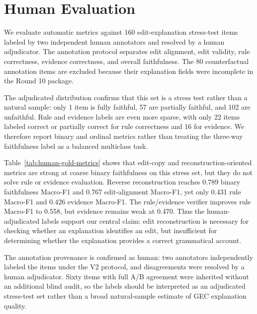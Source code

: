 \section{Human Evaluation}

We evaluate automatic metrics against 160 edit-explanation stress-test items labeled by two independent human annotators and resolved by a human adjudicator. The annotation protocol separates edit alignment, edit validity, rule correctness, evidence correctness, and overall faithfulness. The 80 counterfactual annotation items are excluded because their explanation fields were incomplete in the Round 10 package.

The adjudicated distribution confirms that this set is a stress test rather than a natural sample: only 1 item is fully faithful, 57 are partially faithful, and 102 are unfaithful. Rule and evidence labels are even more sparse, with only 22 items labeled correct or partially correct for rule correctness and 16 for evidence. We therefore report binary and ordinal metrics rather than treating the three-way faithfulness label as a balanced multiclass task.



Table~\ref{tab:human-gold-metrics} shows that edit-copy and reconstruction-oriented metrics are strong at coarse binary faithfulness on this stress set, but they do not solve rule or evidence evaluation. Reverse reconstruction reaches 0.789 binary faithfulness Macro-F1 and 0.767 edit-alignment Macro-F1, yet only 0.431 rule Macro-F1 and 0.426 evidence Macro-F1. The rule/evidence verifier improves rule Macro-F1 to 0.558, but evidence remains weak at 0.470. Thus the human-adjudicated labels support our central claim: edit reconstruction is necessary for checking whether an explanation identifies an edit, but insufficient for determining whether the explanation provides a correct grammatical account.



The annotation provenance is confirmed as human: two annotators independently labeled the items under the V2 protocol, and disagreements were resolved by a human adjudicator. Sixty items with full A/B agreement were inherited without an additional blind audit, so the labels should be interpreted as an adjudicated stress-test set rather than a broad natural-sample estimate of GEC explanation quality.
